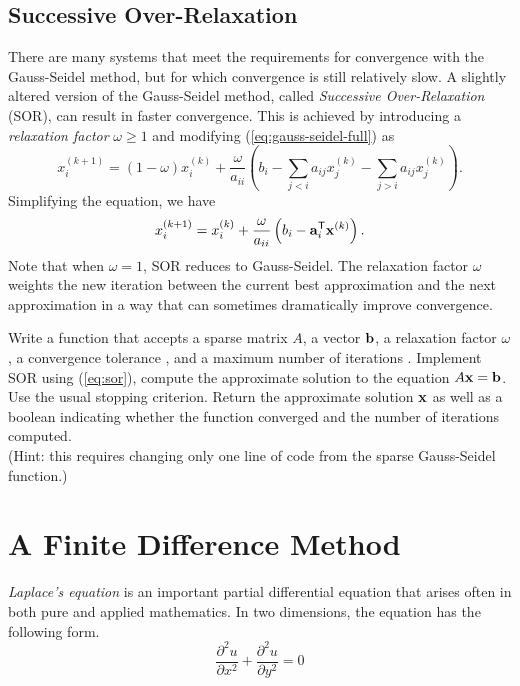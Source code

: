 \subsection*{Successive Over-Relaxation} %

There are many systems that meet the requirements for convergence with the Gauss-Seidel method, but for which convergence is still relatively slow.
A slightly altered version of the Gauss-Seidel method, called \emph{Successive Over-Relaxation} (SOR), can result in faster convergence.
This is achieved by introducing a \emph{relaxation factor} $\omega \ge 1$ and modifying (\ref{eq:gauss-seidel-full}) as
\[
x^{(k+1)}_i = (1-\omega)x^{(k)}_i + \frac{\omega}{a_{ii}} \left(b_i - \sum_{j < i}a_{ij}x^{(k)}_j - \sum_{j > i}a_{ij}x^{(k)}_j \right).
\]
Simplifying the equation, we have
\begin{equation}
x^{(k+1)}_i = x^{(k)}_i + \frac{\omega}{a_{ii}}\left(b_i - \mathbf{a}_i^{\mathsf T}\mathbf{x}^{(k)}\right).
\label{eq:sor}
\end{equation}
Note that when $\omega = 1$, SOR reduces to Gauss-Seidel.
The relaxation factor $\omega$ weights the new iteration between the current best approximation and the next approximation in a way that can sometimes dramatically improve convergence.

\begin{problem} %
Write a function that accepts a sparse matrix $A$, a vector $\mathbf{b}$, a relaxation factor $\omega$, a convergence tolerance , and a maximum number of iterations .
Implement SOR using (\ref{eq:sor}), compute the approximate solution to the equation $A\mathbf{x} = \mathbf{b}$.
Use the usual stopping criterion.
Return the approximate solution $\mathbf{x}$ as well as a boolean indicating whether the function converged and the number of iterations computed.
\\ (Hint: this requires changing only one line of code from the sparse Gauss-Seidel function.)
\label{prob:sor}
\end{problem}

\section*{A Finite Difference Method} %

\emph{Laplace's equation} is an important partial differential equation that arises often in both pure and applied mathematics.
In two dimensions, the equation has the following form.
\begin{equation}
\frac{\partial^2 u}{\partial x^2} + \frac{\partial^2 u}{\partial y^2} = 0
\label{eq:laplaces-equation}
\end{equation}

